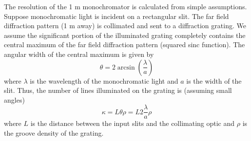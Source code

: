 The resolution of the 1 m monochromator is calculated from simple assumptions. Suppose monochromatic light is incident on a rectangular slit. The far field diffraction pattern (1 m away) is collimated and sent to a diffraction grating. We assume the significant portion of the illuminated grating completely contains the central maximum of the far field diffraction pattern (squared sinc function). The angular width of the central maximum is given by
\begin{equation}
\theta = 2 \arcsin \left( \frac{\lambda}{a} \right)
\end{equation}
where $\lambda$ is the wavelength of the monochromatic light and $a$ is the width of the slit. Thus, the number of lines illuminated on the grating is (assuming small angles)
\begin{equation}
\kappa
=
L \theta \rho
=
L 2\frac{\lambda}{a} \rho
\end{equation}
where $L$ is the distance between the input slits and the collimating optic and $\rho$ is the groove density of the grating.

